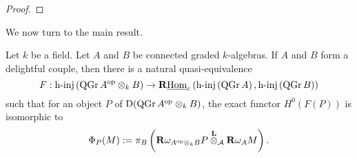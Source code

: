 \begin{proof}
\end{proof}


We now turn to the main result.

\begin{theorem} \label{theorem: derived morita for NCP}
  Let \(k\) be a field. Let \(A\) and \(B\) be connected graded \(k\)-algebras. If \(A\) and \(B\) form a delightful couple, then there is a natural quasi-equivalence 
  \begin{displaymath}
    F : \operatorname{h-inj}\left(\operatorname{QGr}A^{\operatorname{op}} \otimes_k B\right) \to \mathbf{R}\underline{\operatorname{Hom}}_c\left( \operatorname{h-inj}\left(\operatorname{QGr}A\right), \operatorname{h-inj}\left(\operatorname{QGr}B\right) \right)
  \end{displaymath}
  such that for an object \(P\) of \(\mathrm{D}(\operatorname{QGr}A^{\operatorname{op}} \otimes_k B)\), the exact functor \(H^0(F(P))\) is isomorphic to 
  \begin{displaymath}
    \Phi_P(M) :=  \pi_B \left( \mathbf{R}\omega_{A^{\operatorname{op}} \otimes_k B} P \overset{\mathbf{L}}{\otimes}_{\mathcal A} \mathbf{R}\omega_A M \right).
  \end{displaymath}
\end{theorem}

